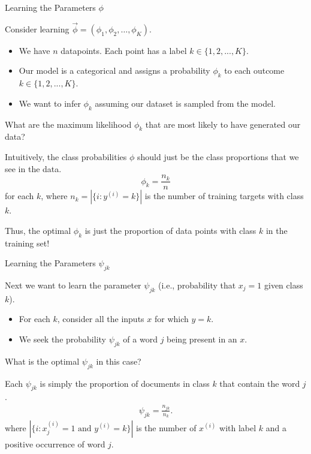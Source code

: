 \documentclass[../../main.tex]{subfiles}
\begin{document}
\begin{frame}[fragile]{Learning the Parameters $\phi$}


Consider learning $\vec \phi = (\phi_1, \phi_2, \ldots, \phi_K)$. 

\begin{itemize}
    \item We have $n$ datapoints. Each point has a label $k\in\{1,2,...,K\}$.
    \item Our model is a categorical and assigns a probability $\phi_k$ to each outcome $k\in\{1,2,...,K\}$.
    \item We want to infer $\phi_k$ assuming our dataset is sampled from the model.
\end{itemize}

What are the maximum likelihood $\phi_k$ that are most likely to have generated our data?

\vspace{0.2cm}

Intuitively, the class probabilities $\phi$ should just be the class proportions that we see in the data. 
$$ \phi_k = \frac{n_k}{n}$$
for each $k$, where $n_k = |\{i : y^{(i)} = k\}|$ is the number of training targets with class $k$.

Thus, the optimal $\phi_k$ is just the proportion of data points with class $k$ in the training set!
\end{frame}

\begin{frame}[fragile]{Learning the Parameters $\psi_{jk}$}

Next we want to learn the parameter $\psi_{jk}$ (i.e., probability that $x_j=1$ given class $k$).

 \begin{itemize}
     \item For each $k$, consider all the inputs $x$ for which $y=k$.
     \item We seek  the probability $\psi_{jk}$ of a word $j$ being present in an $x$.
 \end{itemize}


What is the optimal $\psi_{jk}$ in this case?

\vspace{0.2cm}

Each $\psi_{jk}$ is simply the proportion of documents in class $k$ that contain the word $j$.
\begin{align*}
\psi_{jk} = \frac{n_{jk}}{n_k}.
\end{align*}
where $|\{i : x^{(i)}_j = 1 \text{ and } y^{(i)} = k\}|$ is the number of $x^{(i)}$ with label $k$ and a positive occurrence of word $j$.

\end{frame}
\end{document}
